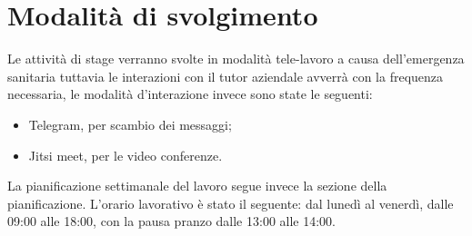 \section{Modalità di svolgimento}\label{sec:modalita-di-svolgimento}

Le attività di stage verranno svolte in modalità tele-lavoro a causa dell'emergenza sanitaria tuttavia le interazioni con il tutor aziendale avverrà con la frequenza necessaria, le modalità d'interazione invece sono state le seguenti:
\begin{itemize}
    \item Telegram, per scambio dei messaggi;
    \item Jitsi meet, per le video conferenze.
\end{itemize}
La pianificazione settimanale del lavoro segue invece la sezione della pianificazione.
L'orario lavorativo è stato il seguente: dal lunedì al venerdì, dalle 09:00 alle 18:00, con la pausa pranzo dalle 13:00 alle 14:00.